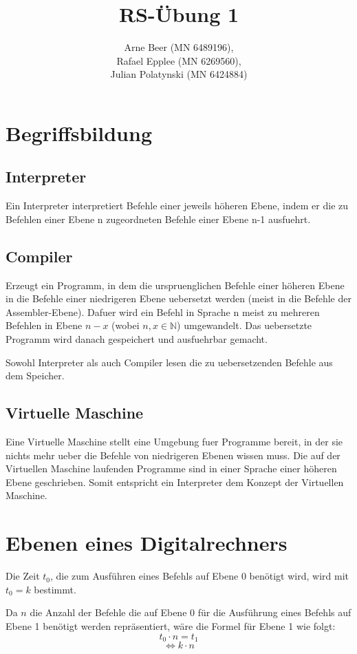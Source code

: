 \documentclass{article}
\title{RS-Übung 1}
\author{Arne Beer (MN 6489196), \\
Rafael Epplee (MN 6269560), \\
Julian Polatynski (MN 6424884)}
\begin{document}
\maketitle

\section{Begriffsbildung}

	\subsection{Interpreter}
	Ein Interpreter interpretiert Befehle einer jeweils höheren Ebene, indem er die zu Befehlen einer Ebene n zugeordneten Befehle einer Ebene n-1 ausfuehrt.

	\subsection{Compiler}
	Erzeugt ein Programm, in dem die urspruenglichen Befehle einer höheren Ebene in die Befehle einer niedrigeren Ebene uebersetzt werden (meist in die Befehle der Assembler-Ebene). Dafuer wird ein Befehl in Sprache n meist zu mehreren Befehlen in Ebene \(n-x\) (wobei \(n, x \in \mathbb{N}\)) umgewandelt. Das uebersetzte Programm wird danach gespeichert und ausfuehrbar gemacht.

	\medskip \noindent
	Sowohl Interpreter als auch Compiler lesen die zu uebersetzenden Befehle aus dem Speicher.

	\subsection{Virtuelle Maschine}
	Eine Virtuelle Maschine stellt eine Umgebung fuer Programme bereit, in der sie nichts mehr ueber die Befehle von niedrigeren Ebenen wissen muss. Die auf der Virtuellen Maschine laufenden Programme sind in einer Sprache einer höheren Ebene geschrieben. Somit entspricht ein Interpreter dem Konzept der Virtuellen Maschine.

\section{Ebenen eines Digitalrechners}
Die Zeit \(t_0\), die zum Ausführen eines Befehls auf Ebene 0 benötigt wird, wird mit \(t_0 = k\) bestimmt.

Da \(n\) die Anzahl der Befehle die auf Ebene 0 für die Ausführung eines Befehls auf Ebene 1 benötigt werden repräsentiert, wäre die Formel für Ebene 1 wie folgt:
\[t_0 \cdot n = t_1\]
\[\Leftrightarrow k \cdot n \]
\end{document}
